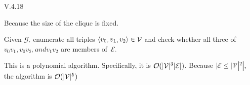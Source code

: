 %
%
\begin{ans}{V.4.18}
\begin{exparts}
\item
Because the size of the clique is fixed.
\item
Given $\mathcal{G}$, enumerate all triples
$\langle v_0,v_1,v_2\rangle\in\mathcal{V}$
and check whether all three of $v_0v_1, v_0v_2, and v_1v_2$
are members of~$\mathcal{E}$.

This is a polynomial algorithm.
Specifically, it is $\operatorname*{\mathcal{O}}(|\mathcal{V}|^3|\mathcal{E}|)$.
Because $|\mathcal{E}\leq |\mathcal{V}|^2|$, the algorithm is
$\operatorname*{\mathcal{O}}(|\mathcal{V}|^5)$
\end{exparts}
\end{ans}
%
%
%
%
